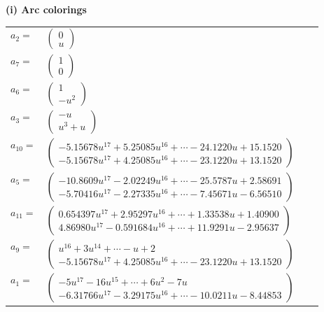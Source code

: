 \documentclass[1p]{elsarticle_modified}
\theoremstyle{definition}
\begin{document}
\flushleft \textbf{(i) Arc colorings}\\
\begin{tabular}{m{7pt} m{180pt} m{7pt} m{180pt} }
\flushright $a_{2}=$&$\begin{pmatrix}0\\u\end{pmatrix}$ \\
\flushright $a_{7}=$&$\begin{pmatrix}1\\0\end{pmatrix}$ \\
\flushright $a_{6}=$&$\begin{pmatrix}1\\- u^2\end{pmatrix}$ \\
\flushright $a_{3}=$&$\begin{pmatrix}- u\\u^3+u\end{pmatrix}$ \\
\flushright $a_{10}=$&$\begin{pmatrix}-5.15678 u^{17}+5.25085 u^{16}+\cdots-24.1220 u+15.1520\\-5.15678 u^{17}+4.25085 u^{16}+\cdots-23.1220 u+13.1520\end{pmatrix}$ \\
\flushright $a_{5}=$&$\begin{pmatrix}-10.8609 u^{17}-2.02249 u^{16}+\cdots-25.5787 u+2.58691\\-5.70416 u^{17}-2.27335 u^{16}+\cdots-7.45671 u-6.56510\end{pmatrix}$ \\
\flushright $a_{11}=$&$\begin{pmatrix}0.654397 u^{17}+2.95297 u^{16}+\cdots+1.33538 u+1.40900\\4.86980 u^{17}-0.591684 u^{16}+\cdots+11.9291 u-2.95637\end{pmatrix}$ \\
\flushright $a_{9}=$&$\begin{pmatrix}u^{16}+3 u^{14}+\cdots- u+2\\-5.15678 u^{17}+4.25085 u^{16}+\cdots-23.1220 u+13.1520\end{pmatrix}$ \\
\flushright $a_{1}=$&$\begin{pmatrix}-5 u^{17}-16 u^{15}+\cdots+6 u^2-7 u\\-6.31766 u^{17}-3.29175 u^{16}+\cdots-10.0211 u-8.44853\end{pmatrix}$ \\

\end{tabular}
\end{document}
